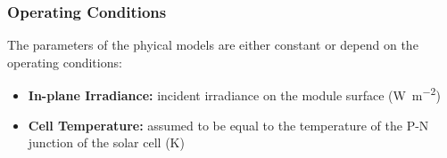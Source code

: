 \begin{frame}    
    \frametitle{Operating Conditions}   
    The parameters of the phyical models are either constant or depend on
    the operating conditions:
    \vspace*{0.3cm}
    \begin{itemize}
        \item \textbf{In-plane Irradiance:} incident irradiance on the module surface (\si{\watt\per\square\meter})
        \item \textbf{Cell Temperature:} assumed to be equal to the temperature of the P-N junction of the solar cell (\si{\kelvin})
    \end{itemize}
\end{frame}

